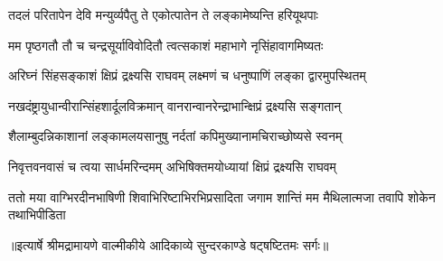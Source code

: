 \twolineshloka
{तदलं परितापेन देवि मन्युर्व्यपैतु ते}
{एकोत्पातेन ते लङ्कामेष्यन्ति हरियूथपाः} %

\twolineshloka
{मम पृष्ठगतौ तौ च चन्द्रसूर्याविवोदितौ}
{त्वत्सकाशं महाभागे नृसिंहावागमिष्यतः} %

\twolineshloka
{अरिघ्नं सिंहसङ्काशं क्षिप्रं द्रक्ष्यसि राघवम्}
{लक्ष्मणं च धनुष्पाणिं लङ्का द्वारमुपस्थितम्} %

\twolineshloka
{नखदंष्ट्रायुधान्वीरान्सिंहशार्दूलविक्रमान्}
{वानरान्वानरेन्द्राभान्क्षिप्रं द्रक्ष्यसि सङ्गतान्} %

\twolineshloka
{शैलाम्बुदन्निकाशानां लङ्कामलयसानुषु}
{नर्दतां कपिमुख्यानामचिराच्छोष्यसे स्वनम्} %

\twolineshloka
{निवृत्तवनवासं च त्वया सार्धमरिन्दमम्}
{अभिषिक्तमयोध्यायां क्षिप्रं द्रक्ष्यसि राघवम्} %

\fourlineindentedshloka
{ततो मया वाग्भिरदीनभाषिणी}
{शिवाभिरिष्टाभिरभिप्रसादिता}
{जगाम शान्तिं मम मैथिलात्मजा}
{तवापि शोकेन तथाभिपीडिता} %


{॥इत्यार्षे श्रीमद्रामायणे वाल्मीकीये आदिकाव्ये सुन्दरकाण्डे षट्षष्टितमः सर्गः॥}

